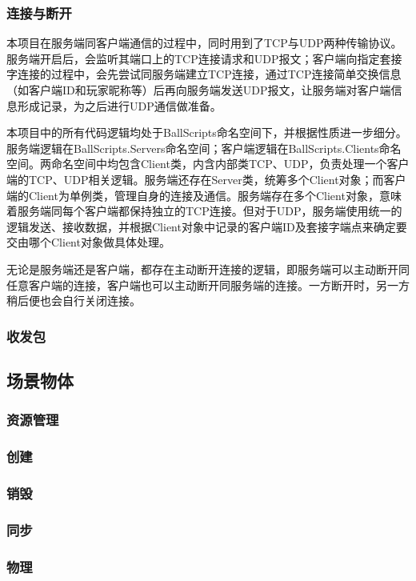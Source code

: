 \documentclass[conference]{IEEEtran}
\begin{document}
\subsubsection{连接与断开}
\quad 

本项目在服务端同客户端通信的过程中，同时用到了TCP与UDP两种传输协议。服务端开启后，会监听其端口上的TCP连接请求和UDP报文；客户端向指定套接字连接的过程中，会先尝试同服务端建立TCP连接，通过TCP连接简单交换信息（如客户端ID和玩家昵称等）后再向服务端发送UDP报文，让服务端对客户端信息形成记录，为之后进行UDP通信做准备。

本项目中的所有代码逻辑均处于BallScripts命名空间下，并根据性质进一步细分。服务端逻辑在BallScripts.Servers命名空间；客户端逻辑在BallScripts.Clients命名空间。两命名空间中均包含Client类，内含内部类TCP、UDP，负责处理一个客户端的TCP、UDP相关逻辑。服务端还存在Server类，统筹多个Client对象；而客户端的Client为单例类，管理自身的连接及通信。服务端存在多个Client对象，意味着服务端同每个客户端都保持独立的TCP连接。但对于UDP，服务端使用统一的逻辑发送、接收数据，并根据Client对象中记录的客户端ID及套接字端点来确定要交由哪个Client对象做具体处理。

无论是服务端还是客户端，都存在主动断开连接的逻辑，即服务端可以主动断开同任意客户端的连接，客户端也可以主动断开同服务端的连接。一方断开时，另一方稍后便也会自行关闭连接。

\subsubsection{收发包}

\subsection{场景物体}
\subsubsection{资源管理}
\subsubsection{创建}
\subsubsection{销毁}
\subsubsection{同步}
\subsubsection{物理}
\end{document}
